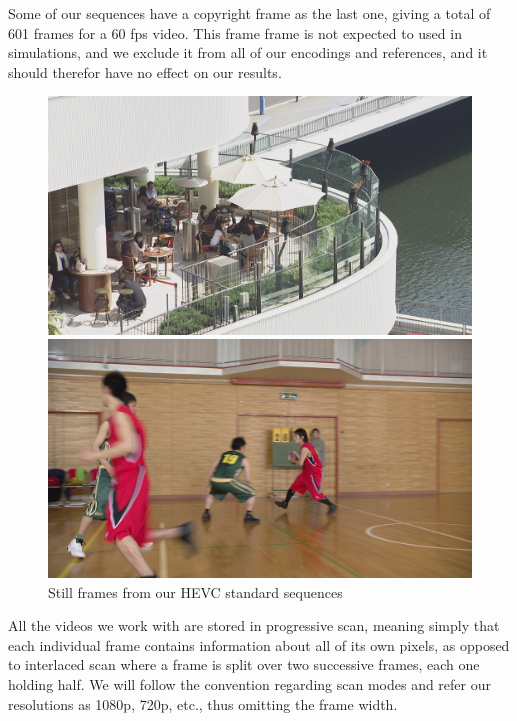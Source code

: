 Some of our sequences have a copyright frame as the last one, giving a total of 601 frames for a 60 \gls{fps} video. This frame frame is not expected to used in simulations, and we exclude it from all of our encodings and references, and it should therefor have no effect on our results.

\begin{figure}[!tbp]
  \centering
  \begin{minipage}[b]{0.4\textwidth}
    \includegraphics[scale=0.1]{pictures/yuv-player-captures/BQTerrace_1920x1080_60_1}
  \end{minipage}
  \hfill
  \begin{minipage}[b]{0.4\textwidth}
    \includegraphics[scale=0.1]{pictures/yuv-player-captures/BasketballDrive_1920x1080_50_1}
  \end{minipage}
  \caption{Still frames from our HEVC standard sequences}
  \label{fig:test-sequences}
\end{figure}

All the videos we work with are stored in progressive scan, meaning simply that each individual frame contains information about all of its own pixels, as opposed to interlaced scan where a frame is split over two successive frames, each one holding half. We will follow the convention regarding scan modes and refer our resolutions as 1080p, 720p, etc., thus omitting the frame width.

